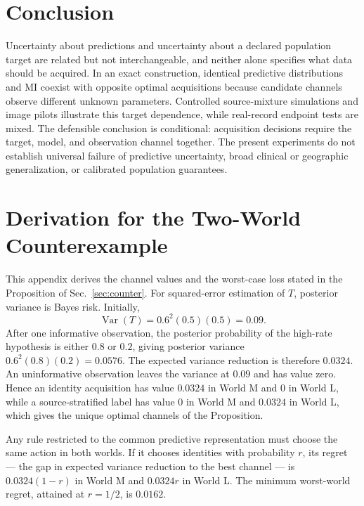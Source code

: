\documentclass[11pt]{article}
\begin{document}
\section{Conclusion}

Uncertainty about predictions and uncertainty about a declared population target are related but not interchangeable, and neither alone specifies what data should be acquired. In an exact construction, identical predictive distributions and MI coexist with opposite optimal acquisitions because candidate channels observe different unknown parameters. Controlled source-mixture simulations and image pilots illustrate this target dependence, while real-record endpoint tests are mixed. The defensible conclusion is conditional: acquisition decisions require the target, model, and observation channel together. The present experiments do not establish universal failure of predictive uncertainty, broad clinical or geographic generalization, or calibrated population guarantees.

\appendix
\section{Derivation for the Two-World Counterexample}
\label{app:counter-proof}

This appendix derives the channel values and the worst-case loss stated in the Proposition of Sec.~\ref{sec:counter}. For squared-error estimation of $T$, posterior variance is Bayes risk. Initially,
\begin{equation}
 \operatorname{Var}(T)=0.6^2(0.5)(0.5)=0.09.
\end{equation}
After one informative observation, the posterior probability of the high-rate hypothesis is either $0.8$ or $0.2$, giving posterior variance $0.6^2(0.8)(0.2)=0.0576$. The expected variance reduction is therefore $0.0324$. An uninformative observation leaves the variance at $0.09$ and has value zero. Hence an identity acquisition has value $0.0324$ in World M and $0$ in World L, while a source-stratified label has value $0$ in World M and $0.0324$ in World L, which gives the unique optimal channels of the Proposition.

Any rule restricted to the common predictive representation must choose the same action in both worlds. If it chooses identities with probability $r$, its regret --- the gap in expected variance reduction to the best channel --- is $0.0324(1-r)$ in World M and $0.0324r$ in World L. The minimum worst-world regret, attained at $r=1/2$, is $0.0162$.
\end{document}
